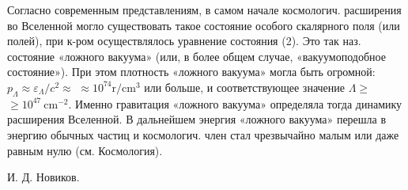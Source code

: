 \documentclass[10pt]{article}
\begin{document}
Согласно современным представлениям, в самом начале космологич. расширения во Вселенной могло существовать такое состояние особого скалярного поля (или полей), при к-ром осуществлялось уравнение состояния (2). Это так наз. состояние «ложного вакуума» (или, в более общем случае, «вакуумоподобное состояние»). При этом плотность «ложного вакуума» могла быть огромной: $p_{\Lambda} \approx \varepsilon_{\Lambda} / c^{2} \approx$ $\approx 10^{74} \mathrm{r} / \mathrm{cm}^{3}$ или больше, и соответствующее значение $\Lambda \geqslant$ $\geqslant 10^{47} \mathrm{~cm}^{-2}$. Именно гравитация «ложного вакуума» определяла тогда динамику расширения Вселенной. В дальнейшем энергия «ложного вакуума» перешла в энергию обычных частиц и космологич. член стал чрезвычайно малым или даже равным нулю (см. Космология).



И. Д. Новиков.
\end{document}

